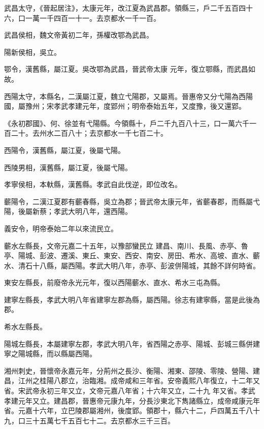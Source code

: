 \begin{pinyinscope}
 武昌太守，《晉起居注》，太康元年，改江夏為武昌郡。領縣三，戶二千五百四十六，口一萬一千四百一十一。去京都水一千一百。



 武昌侯相，魏文帝黃初二年，孫權改鄂為武昌。



 陽新侯相，吳立。



 鄂令，漢舊縣，屬江夏。吳改鄂為武昌，晉武帝太康
 元年，復立鄂縣，而武昌如故。



 西陽太守，本縣名，二漢屬江夏，魏立弋陽郡，又屬焉。晉惠帝又分弋陽為西陽國，屬豫州；宋孝武孝建元年，度郢州；明帝泰始五年，又度豫，後又還郢。



 《永初郡國》、何、徐並有弋陽縣。今領縣十，戶二千九百八十三，口一萬六千一百二十。去州水二百八十；去京都水一千七百二十。



 西陽令，漢舊縣，屬江夏，後屬弋陽。



 西陵男相，漢舊縣，屬江夏，後屬弋陽。



 孝寧侯相，本軑縣，漢舊縣。孝武自此伐逆，即位改名。



 蘄陽令，二漢江夏郡有蘄春縣，吳立為郡；晉武帝太康元年，省蘄春郡，而縣屬弋陽，後屬新蔡；孝武大明八年，還西陽。



 義安令，明帝泰始二年以來流民立。



 蘄水左縣長，文帝元嘉二十五年，以豫部蠻民立
 建昌、南川、長風、赤亭、魯亭、陽城、彭波、遷溪、東丘、東安、西安、南安、房田、希水、高坡、直水、蘄水、清石十八縣，屬西陽。孝武大明八年，赤亭、彭波併陽城，其餘不詳何時省。



 東安左縣長，前廢帝永光元年，復以西陽蘄水、直水、希水三屯為縣。



 建寧左縣長，孝武大明八年省建寧左郡為縣，屬西陽。徐志有建寧縣，當是此後為郡。



 希水左縣長。



 陽城左縣長，本屬建寧左郡，孝武大明八年，省西陽之赤亭、陽城、彭城三縣併建寧之陽城縣，而以縣屬西陽。



 湘州刺史，晉懷帝永嘉元年，分荊州之長沙、衡陽、湘東、邵陵、零陵、營陽、建昌，江州之桂陽八郡立，治臨湘。成帝咸和三年省。安帝義熙八年復立，十二年又省。宋武帝永初三年又立，文帝元嘉八年省；十六年又立，二十九
 年又省。孝武孝建元年又立。建昌郡，晉惠帝元康九年，分長沙東北下雋諸縣立，成帝咸康元年省。元嘉十六年，立巴陵郡屬湘州，後度郢。領郡十，縣六十二，戶四萬五千八十九，口三十五萬七千五百七十二。去京都水三千三百。




\end{pinyinscope}
